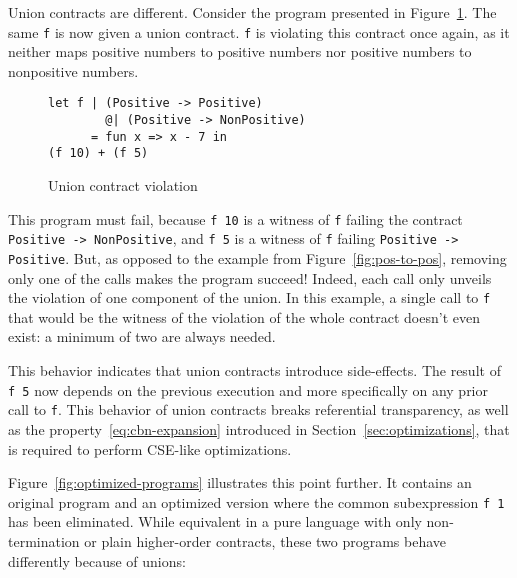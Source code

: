 \documentclass[sigplan,screen,10pt]{acmart}
\newcommand{\nickel}[1]{\lstinline[language=nickel]{#1}}
\begin{document}
%

Union contracts are different. Consider the program presented in
Figure~\ref{fig:wrong-union-function}. The same \nickel{f} is now given a union
contract. \nickel{f} is violating this contract once again, as it neither maps
positive numbers to positive numbers nor positive numbers to nonpositive numbers.

\begin{figure}[h]
\begin{lstlisting}[language=nickel]
let f | (Positive -> Positive)
        @| (Positive -> NonPositive)
      = fun x => x - 7 in
(f 10) + (f 5)
\end{lstlisting}
\caption{Union contract violation}
\label{fig:wrong-union-function}
\end{figure}

This program must fail, because \nickel{f 10} is a witness of \nickel{f} failing
the contract \nickel{Positive -> NonPositive}, and \nickel{f 5} is a witness of
\nickel{f} failing \nickel{Positive -> Positive}.  But, as opposed to the
example from Figure~\ref{fig:pos-to-pos}, removing only one of the calls makes the
program succeed! Indeed, each call only unveils the violation of one component
of the union. In this example, a single call to \nickel{f} that would be the
witness of the violation of the whole contract doesn't even exist: a minimum of
two are always needed.

This behavior indicates that union contracts introduce side-effects. The result
of \nickel{f 5} now depends on the previous execution and more specifically on
any prior call to \nickel{f}. This behavior of union contracts breaks
referential transparency, as well as the property~\ref{eq:cbn-expansion}
introduced in Section~\ref{sec:optimizations}, that is required to perform
CSE-like optimizations.

Figure~\ref{fig:optimized-programs} illustrates this point further. It contains
an original program and an optimized version where the common subexpression
\nickel{f 1} has been eliminated. While equivalent in a pure language with only
non-termination or plain higher-order contracts, these two programs behave
differently because of unions:
\end{document}
